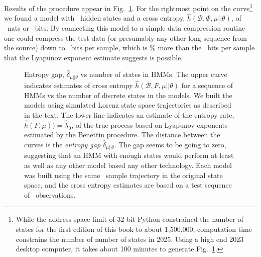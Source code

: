 Results of the procedure appear in Fig.~\ref{fig:LikeLor}.  For the
rightmost point on the curve\footnote{While the address space limit of
  32 bit Python constrained the number of states for the first edition
  of this book to about 1,500,000, computation time constrains the
  number of number of states in 2025.  Using a high end 2023 desktop
  computer, it takes about 100 minutes to generate
  Fig.~\ref{fig:LikeLor}.} we found a model with
%
\toyLikeLornstates~hidden states and a cross entropy,
$\hat h(\mathcal{B},\Phi,\mu||\theta)$, of
\toyLikeLorcrossentropy~nats or \toyLikeLorcrossentropybits~bits.  By
connecting this model to a simple data compression routine one could
compress the test data (or presumably any other long sequence from the
source) down to \toyLikeLorcrossentropybits~bits per sample, which is
\toyLikeLorGapPercent\% more than the \toyLikeLorEntropyBits~bits per
sample that the Lyapunov exponent estimate suggests is possible.
\begin{figure}[htbp]
  \caption[Entropy gap,
  $\hat \delta_{\mu||\theta}$, vs number of states in HMMs]%
  {Entropy gap, $\hat \delta_{\mu||\theta}$ vs number of states in
    HMMs.  The upper curve indicates estimates of cross entropy
    $\hat h(\mathcal{B},F,\mu||\theta)$ for a sequence of HMMs vs the
    number of discrete states in the models.  We built the models
    using simulated Lorenz state space trajectories as described in
    the text.  The lower line indicates an estimate of the entropy
    rate, $\hat h(F,\mu)) = \hat \lambda_0$, of the true process based
    on Lyapunov exponents estimated by the Benettin procedure.  The
    distance between the curves is the \emph{entropy gap}
    $\hat \delta_{\mu||\theta}$. The gap seems to be going to zero,
    suggesting that an HMM with enough states would perform at least
    as well as any other model based any other technology.  Each model
    was built using the same \toyLikeLorntrain~sample trajectory in
    the original state space, and the cross entropy estimates are
    based on a test sequence of \toyLikeLorntest~observations.}
  \label{fig:LikeLor}
\end{figure}

